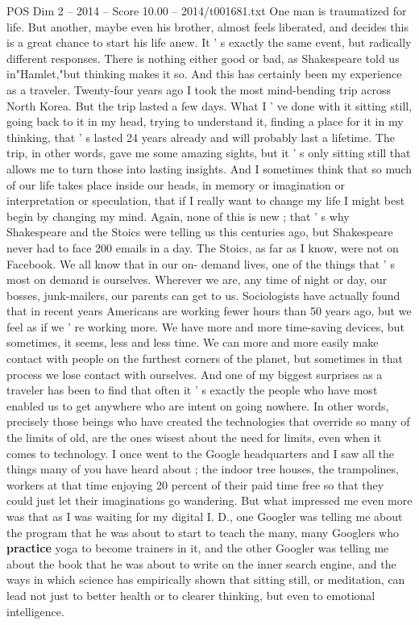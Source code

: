 \begin{textsample}{POS Dim 2 – 2014 – Score 10.00 – 2014/t001681.txt}
One man is traumatized for life.
But another, maybe even his brother, almost feels liberated, and decides this is a great chance to start his life anew.
It ' s exactly the same event, but radically different responses.
There is nothing either good or bad, as Shakespeare told us in"Hamlet,"but thinking makes it so.
And this has certainly been my experience as a traveler.
Twenty-four years ago I took the most mind-bending trip across North Korea.
But the trip lasted a few days.
What I ' ve done with it sitting still, going back to it in my head, trying to understand it, finding a place for it in my thinking, that ' s lasted 24 years already and will probably last a lifetime.
The trip, in other words, gave me some amazing sights, but it ' s only sitting still that allows me to turn those into lasting insights.
And I sometimes think that so much of our life takes place inside our heads, in memory or imagination or interpretation or speculation, that if I really want to change my life I might best begin by changing my mind.
Again, none of this is new ; that ' s why Shakespeare and the Stoics were telling us this centuries ago, but Shakespeare never had to face 200 emails in a day.
The Stoics, as far as I know, were not on Facebook.
We all know that in our on- demand lives, one of the things that ' s most on demand is ourselves.
Wherever we are, any time of night or day, our bosses, junk-mailers, our parents can get to us.
Sociologists have actually found that in recent years Americans are working fewer hours than 50 years ago, but we feel as if we ' re working more.
We have more and more time-saving devices, but sometimes, it seems, less and less time.
We can more and more easily make contact with people on the furthest corners of the planet, but sometimes in that process we lose contact with ourselves.
And one of my biggest surprises as a traveler has been to find that often it ' s exactly the people who have most enabled us to get anywhere who are intent on going nowhere.
In other words, precisely those beings who have created the technologies that override so many of the limits of old, are the ones wisest about the need for limits, even when it comes to technology.
I once went to the Google headquarters and I saw all the things many of you have heard about ; the indoor tree houses, the trampolines, workers at that time enjoying 20 percent of their paid time free so that they could just let their imaginations go wandering.
But what impressed me even more was that as I was waiting for my digital I.
D., one Googler was telling me about the program that he was about to start to teach the many, many Googlers who \textbf{practice} yoga to become trainers in it, and the other Googler was telling me about the book that he was about to write on the inner search engine, and the ways in which science has empirically shown that sitting still, or meditation, can lead not just to better health or to clearer thinking, but even to emotional intelligence.

\end{textsample}
